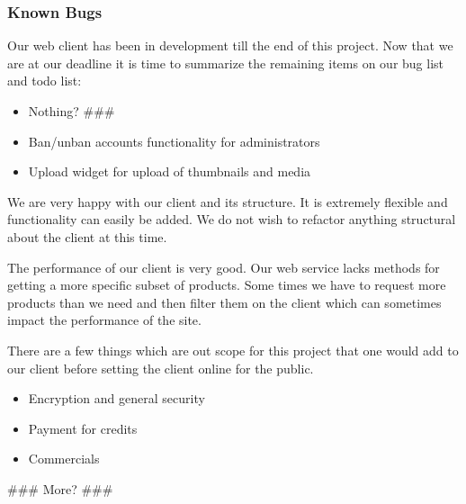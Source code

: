 \subsubsection{Known Bugs}
Our web client has been in development till the end of this project. Now that we are at our deadline it is time to summarize the remaining items on our bug list and todo list:

\begin{itemize}
\item Nothing? \#\#\# 
\end{itemize}

\begin{itemize}
\item Ban/unban accounts functionality for administrators
\item Upload widget for upload of thumbnails and media
\end{itemize}

We are very happy with our client and its structure. It is extremely flexible and functionality can easily be added. We do not wish to refactor anything structural about the client at this time.

The performance of our client is very good. Our web service lacks methods for getting a more specific subset of products. Some times we have to request more products than we need and then filter them on the client which can sometimes impact the performance of the site.

There are a few things which are out scope for this project that one would add to our client before setting the client online for the public.

\begin{itemize}
\item Encryption and general security
\item Payment for credits
\item Commercials
\end{itemize}
\#\#\# More? \#\#\#